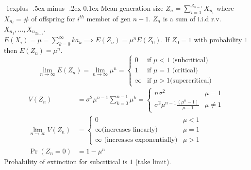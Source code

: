 \documentclass[landscape]{article}
\makeatletter
\renewcommand{\subsection}{\@startsection{subsection}{2}{0mm}%
                                {-1explus -.5ex minus -.2ex}%
                                {0.1ex}%
                                {\color{orange}\normalfont\normalsize\bfseries}}
\makeatother
\begin{document}
\begin{multicols*}{3}
\subsection{Mean generation size} $Z_n = \sum_{i=1}^{Z_{n-1}}X_{n_i}$
where $X_{n_i} =$\# of offspring for $i^{th}$ member of gen
$n-1$. $Z_n$ is a sum of i.i.d r.v.
$X_{n_1}, \ldots, X_{n_{Z_{n-1}}}$.  \\
$E(X_i) = \mu = \sum_{k=0}^{\infty}ka_k \implies E(Z_n) = \mu^n
E(Z_0)$. If $Z_0 = 1$ with probability $1$ then $E(Z_n) = \mu^n$.
$$ \lim_{n\to\infty} E(Z_n) = \lim_{n\to\infty} \mu^n =
\begin{cases}
  0 & \text{if } \mu < 1 \text{ (subcritical)} \\1 & \text{if } \mu =
  1 \text{ (critical)} \\\infty & \text{if } \mu > 1 \text{
    (supercritical)}
\end{cases}
$$
\begin{align*}
  V(Z_n) & =  \sigma^2 \mu^{n-1} \sum_{k=0}^{n-1}\mu^k=
           \begin{cases}
             n \sigma^2 & \mu = 1 \\ \sigma^2 \mu^{n-1} \frac{(\mu^n -
               1)}{\mu - 1} & \mu \neq 1
           \end{cases}
  \\ \lim_{n\to\infty} V(Z_n) & =
                                \begin{cases}
                                  0 & \mu < 1 \\\infty \text{
                                    (increases linearly)} & \mu = 1 \\
                                  \infty \text{ (increases
                                    exponentially)} & \mu > 1
                                \end{cases}
  \\ \Pr(Z_n = 0) & = 1 - \mu^n
\end{align*}
Probability of extinction for subcritical is $1$ (take limit).

\end{multicols*}
\end{document}
